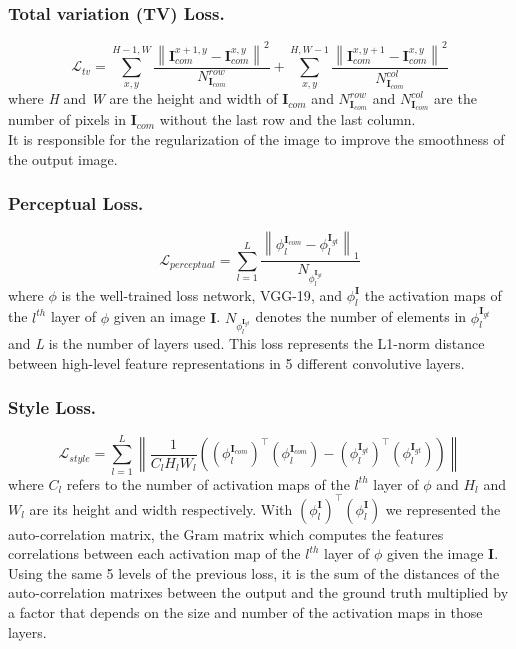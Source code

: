 \documentclass[10pt,twocolumn,letterpaper]{article}
\newcommand\norm[1]{\left\lVert#1\right\rVert}
\begin{document}
\subsubsection{Total variation (TV) Loss.}
\begin{dmath}
    \mathcal{L}_{tv} = \sum^{H-1,W}_{x,y} \frac{\norm{ \mathbf{I}^{x+1,y}_{com}
    - \mathbf{I}^{x,y}_{com} }^2}{N^{row}_{\mathbf{I}_{com}}} +
    \sum^{H,W-1}_{x,y} \frac{\norm{ \mathbf{I}^{x,y+1}_{com} -
    \mathbf{I}^{x,y}_{com} }^2}{N^{col}_{\mathbf{I}_{com}}}
\end{dmath}
where \textit{H} and \textit{W} are the height and width of $\mathbf{I}_{com}$
and $N^{row}_{\mathbf{I}_{com}}$ and $N^{col}_{\mathbf{I}_{com}}$ are the number
of pixels in $\mathbf{I}_{com}$ without the last row and the last column.
\\
It is responsible for the regularization of the image to improve the smoothness
of the output image.

\subsubsection{Perceptual Loss.}
\begin{dmath}
    \mathcal{L}_{perceptual} = \sum^L_{l=1} \frac{\norm{
      \phi^{\mathbf{I}_{com}}_l - \phi^{\mathbf{I}_{gt}}_l
    }_1}{N_{\phi^{\mathbf{I}_{gt}}_l}}
\end{dmath}
where \(\phi\) is the well-trained loss network, VGG-19\cite{simonyan2014very},
and \(\phi^{\mathbf{I}}_l\) the activation maps of the \(l^{th}\) layer of
\(\phi\) given an image \(\mathbf{I}\).
\(N_{\phi^{\mathbf{I}_{gt}}_l}\) denotes the number of elements in
\(\phi^{\mathbf{I}_{gt}}_l\) and \textit{L} is the number of layers used.
This loss represents the L1-norm distance between high-level feature
representations in 5 different convolutive layers.

\subsubsection{Style Loss.}
\begin{dmath}
        \mathcal{L}_{style} = \sum^L_{l=1}\norm{ \frac{1}{C_l H_l W_l}
        ((\phi^{\mathbf{I}_{com}}_l)^\top(\phi^{\mathbf{I}_{com}}_l) -
        (\phi^{\mathbf{I}_{gt}}_l)^\top(\phi^{\mathbf{I}_{gt}}_l)  )}
\end{dmath}
where \(C_l\) refers to the number of activation maps of the \(l^{th}\) layer of
\(\phi\) and \(H_l\) and \(W_l\) are its height and width respectively. With
\((\phi^{\mathbf{I}}_l)^\top(\phi^{\mathbf{I}}_l)\) we represented the
auto-correlation matrix, the Gram matrix\cite{gatys1508neural} which computes
the features correlations between each activation map of the \(l^{th}\) layer of
\(\phi\) given the image \(\mathbf{I}\).\\
Using the same 5 levels of the previous loss, it is the sum of the distances of
the auto-correlation matrixes between the output and the ground truth multiplied
by a factor that depends on the size and number of the activation maps in those
layers.
\end{document}
